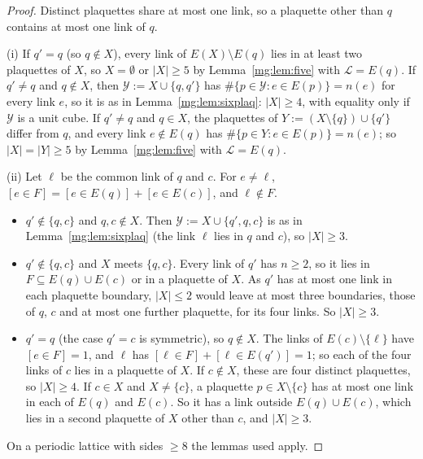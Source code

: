 \documentclass[11pt,a4paper]{article}
\theoremstyle{definition}
\theoremstyle{remark}
\begin{document}
\begin{proof}
Distinct plaquettes share at most one link, so a plaquette other than $q$ contains at most one link of $q$.

(i) If $q'=q$ (so $q\notin X$), every link of $E(X)\setminus E(q)$ lies in at least two plaquettes of $X$, so $X=\emptyset$ or $|X|\ge5$ by
Lemma~\ref{mg:lem:five} with $\mathcal L=E(q)$. If $q'\ne q$ and $q\notin X$, then $\mathcal Y:=X\cup\{q,q'\}$ has $\#\{p\in\mathcal Y:e\in E(p)\}=n(e)$ for every
link $e$, so it is as in Lemma~\ref{mg:lem:sixplaq}: $|X|\ge4$, with equality only if $\mathcal Y$ is a unit cube. If $q'\ne q$ and $q\in X$, the plaquettes of
$Y:=(X\setminus\{q\})\cup\{q'\}$ differ from $q$, and every link $e\notin E(q)$ has $\#\{p\in Y:e\in E(p)\}=n(e)$; so $|X|=|Y|\ge5$ by Lemma~\ref{mg:lem:five}
with $\mathcal L=E(q)$.

(ii) Let $\ell$ be the common link of $q$ and $c$. For $e\ne\ell$, $[e\in F]=[e\in E(q)]+[e\in E(c)]$, and $\ell\notin F$.
\begin{itemize}
\item $q'\notin\{q,c\}$ and $q,c\notin X$. Then $\mathcal Y:=X\cup\{q',q,c\}$ is as in Lemma~\ref{mg:lem:sixplaq} (the link $\ell$ lies in $q$ and $c$), so
$|X|\ge3$.
\item $q'\notin\{q,c\}$ and $X$ meets $\{q,c\}$. Every link of $q'$ has $n\ge2$, so it lies in $F\subseteq E(q)\cup E(c)$ or in a plaquette of $X$. As $q'$ has at
most one link in each plaquette boundary, $|X|\le2$ would leave at most three boundaries, those of $q$, $c$ and at most one further plaquette, for its four
links. So $|X|\ge3$.
\item $q'=q$ (the case $q'=c$ is symmetric), so $q\notin X$. The links of $E(c)\setminus\{\ell\}$ have $[e\in F]=1$, and $\ell$ has $[\ell\in F]+[\ell\in E(q')]=1$;
so each of the four links of $c$ lies in a plaquette of $X$. If $c\notin X$, these are four distinct plaquettes, so $|X|\ge4$. If $c\in X$ and
$X\neq\{c\}$, a plaquette $p\in X\setminus\{c\}$ has at most one link in each of $E(q)$ and $E(c)$. So it has a link outside $E(q)\cup E(c)$, which lies in a
second plaquette of $X$ other than $c$, and $|X|\ge3$.
\end{itemize}
On a periodic lattice with sides $\ge8$ the lemmas used apply.
\end{proof}
\end{document}
